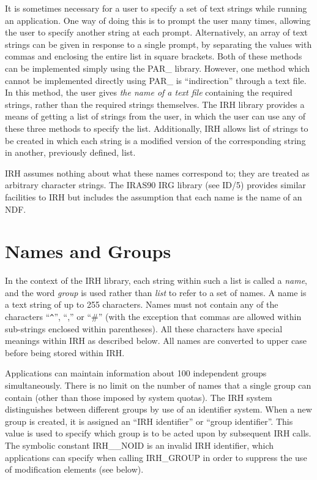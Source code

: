 It is sometimes necessary for a user to specify a set of text strings while
running an application. One way of doing this is to prompt the user many times,
allowing the user to specify another string at each prompt. Alternatively, an
array of text strings can be given in response to a single prompt, by separating
the values with commas and enclosing the entire list in square brackets. Both of
these methods can be implemented simply using the PAR\_ library. However, one
method which cannot be implemented directly using PAR\_ is ``indirection''
through a text file. In this method, the user gives {\em the name of a text
file} containing the required strings, rather than the required strings
themselves. The IRH library provides a means of getting a list of strings from
the user, in which the user can use any of these three methods to specify the
list. Additionally, IRH allows list of strings to be created in which each
string is a modified version of the corresponding string in another, previously
defined, list. 

IRH assumes nothing about what these names correspond to; they are treated as 
arbitrary character strings. The IRAS90 IRG library (see ID/5) provides similar 
facilities to IRH but includes the assumption that each name is the name of an 
NDF.

\section {Names and Groups}
In the context of the IRH library, each string within such a list is called a
{\em name}, and the word {\em group} is used rather than {\em list} to refer to
a set of names. A name is a text string of up to 255 characters. Names must not
contain any of the characters ``\verb+^+'', ``,'' or ``\#'' (with the exception
that commas are allowed within sub-strings enclosed within parentheses). All
these characters have special meanings within IRH as described below. All names
are converted to upper case before being stored within IRH. 

Applications can maintain information about 100 independent groups
simultaneously. There is no limit on the number of names that a single group can
contain (other than those imposed by system quotas).
The IRH system distinguishes between different groups by use of an
{identifier} system. When a new group is created, it is assigned an ``IRH
identifier'' or ``group identifier''. This value is used to specify which group
is to be acted upon by subsequent IRH calls. The symbolic constant IRH\_\_NOID
is an invalid IRH identifier, which applications can specify when calling
IRH\_GROUP in order to suppress the use of modification elements
(see below). 

